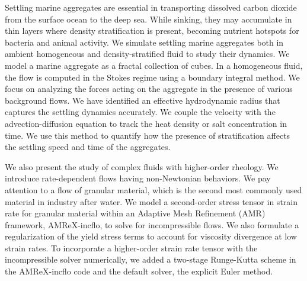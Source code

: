 
\par
Settling marine aggregates are essential in transporting dissolved carbon dioxide from the surface ocean to the deep sea. While sinking, they may accumulate in thin layers where density stratification is present, becoming nutrient hotspots for bacteria and animal activity. We simulate settling marine aggregates both in ambient homogeneous and density-stratified fluid to study their dynamics. 
We model a marine aggregate as a fractal collection of cubes. 
In a homogeneous fluid, the flow is computed in the Stokes regime using a boundary integral method.
We focus on analyzing the forces acting on the aggregate in the presence of various background flows.
We have identified an effective hydrodynamic radius that captures the settling dynamics accurately.
We couple the velocity with the advection-diffusion equation to track the heat density or salt concentration in time. We use this method to quantify how the presence of stratification affects the settling speed and time of the aggregates.

\par
We also present the study of complex fluids with higher-order rheology. We introduce rate-dependent flows having non-Newtonian behaviors. 
We pay attention to a flow of granular material, which is the second most commonly used material in industry after water.
We model a second-order stress tensor in strain rate for granular material
within an Adaptive Mesh Refinement (AMR) framework, AMReX-incflo, to solve for incompressible flows.
We also formulate a regularization of the yield stress terms to account for viscosity divergence at low strain rates. 
To incorporate a higher-order strain rate tensor with the incompressible solver numerically, we added a two-stage Runge-Kutta scheme in the AMReX-incflo code and the default solver, the explicit Euler method.